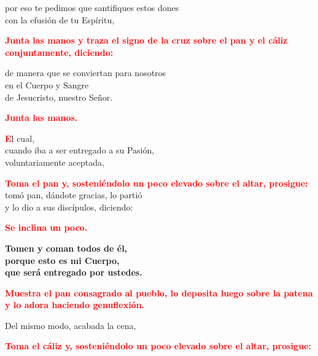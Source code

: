\documentclass[12pt, letterpaper, spanish]{report}
\begin{document}
\Large por eso te pedimos que santifiques estos dones\\
con la efusi\'on de tu Esp\'iritu,\newline

\large{\bfseries \textcolor{red}{Junta las manos y traza el signo de la cruz sobre el pan y el c\'aliz conjuntamente, diciendo:}}\newline

\Large de manera que se conviertan para nosotros\\
en el Cuerpo y \Huge{\textcolor{red}{}} \Large Sangre\\
de Jesucristo, nuestro Se\~nor.\newline

\large{\bfseries \textcolor{red}{Junta las manos.}}

\Large \lettrine[lines=1]{\bfseries \textcolor{red}{E}}{}l cual,\\
cuando iba a ser entregado a su Pasi\'on,\\
voluntariamente aceptada,\newline

\large{\bfseries \textcolor{red}{Toma el pan y, sosteni\'endolo un poco elevado sobre el altar, prosigue:}}\newline \\

\Large tom\'o pan, d\'andote gracias, lo parti\'o\\
y lo dio a sus disc\'ipulos, diciendo:\newline

\large{\bfseries \textcolor{red}{Se inclina un poco.}} \newline

\LARGE{ \bfseries{ Tomen y coman todos de \'el,\\
porque esto es mi Cuerpo,\\
que ser\'a entregado por ustedes.}}\newline

\large{\bfseries \textcolor{red}{Muestra el pan consagrado al pueblo, lo deposita luego sobre la patena y lo adora haciendo genuflexi\'on.}}\newline

\Large Del mismo modo, acabada la cena,\newline

\large{\bfseries \textcolor{red}{Toma el c\'aliz y, sosteni\'endolo un poco elevado sobre el altar, prosigue:}}\newline
\end{document}
